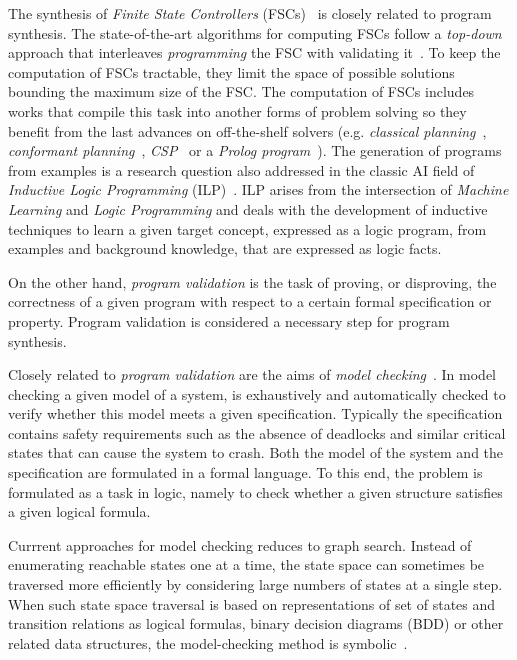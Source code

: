 \documentclass[10pt,a4paper]{paper}
\begin{document}
The synthesis of {\it Finite State Controllers} (FSCs)~\cite{geffner:policies:IJCAI15} is closely related to program synthesis. The state-of-the-art algorithms for computing FSCs follow a {\it top-down} approach that interleaves {\it programming} the FSC with validating it~\cite{sergio:aprograming:ijcai16}. To keep the computation of FSCs tractable, they limit the space of possible solutions bounding the maximum size of the FSC. The computation of FSCs includes works that compile this task into another forms of problem solving so they benefit from the last advances on off-the-shelf solvers (e.g. {\em classical planning}~\cite{sergio:aprograming:icaps16}, {\em conformant planning}~\cite{Geffner:FSM:AAAI10}, {\em CSP}~\cite{Infantes:FSC:ECAI2010} or a {\em Prolog program}~\cite{Giacomo:FSM:ICAPS13}). The generation of programs from examples is a research question also addressed in the classic AI field of {\em Inductive Logic Programming} (ILP)~\cite{muggleton1991inductive,Raedt:relationalML:book2008}. ILP arises from the intersection of {\em Machine Learning} and {\em Logic Programming} and deals with the development of inductive techniques to learn a given target concept, expressed as a  logic program,  from  examples  and  background  knowledge, that are expressed as logic facts.

On the other hand, {\em program validation} is the task of proving, or disproving, the correctness of a given program with respect to a certain formal specification or property. Program validation is considered a necessary step for program synthesis.

Closely related to {\em program validation} are the aims of {\em model checking}~\cite{clarke1999model}. In model checking a given model of a system, is exhaustively and automatically checked to verify  whether this model meets a given specification. Typically the specification contains safety requirements such as the absence of deadlocks and similar critical states that can cause the system to crash. Both the model of the system and the specification are formulated in a formal language. To this end, the problem is formulated as a task in logic, namely to check whether a given structure satisfies a given logical formula. 

Currrent approaches for model checking reduces to graph search. Instead of enumerating reachable states one at a time, the state space can sometimes be traversed more efficiently by considering large numbers of states at a single step. When such state space traversal is based on representations of set of states and transition relations as logical formulas, binary decision diagrams (BDD) or other related data structures, the model-checking method is symbolic~\cite{mcmillan1993symbolic}.
\end{document}
